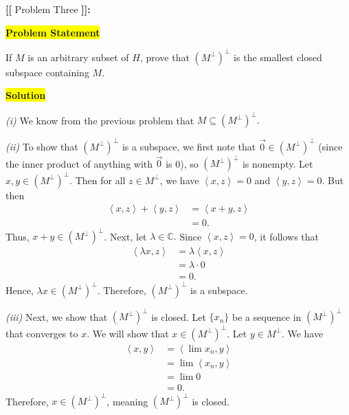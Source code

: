 \documentclass[12pt]{article}
\newcommand{\mybox}{%
    \collectbox{%
        \setlength{\fboxsep}{2pt}%
        \fbox{\BOXCONTENT}%
    }%
}
\begin{document}
\pagebreak

\noindent \textbf{{\huge [}{\Large [}} Problem Three \textbf{{\Large ]}{\huge ]}}{\Large \textbf{:}}

\vspace{3mm}

\noindent\mybox{\colorbox{yellow}{\textbf{Problem Statement}}}\hspace{3mm}\hrulefill 

\noindent If $M$ is an arbitrary subset of $H$, prove that $\left(M^{\perp}\right)^{\perp}$ is the smallest closed subspace containing $M$.

\vspace{5mm}

\noindent\mybox{\colorbox{yellow}{\textbf{Solution}}}\hspace{3mm}\hrulefill

\noindent \textit{(i)} We know from the previous problem that $M\subseteq \left(M^{\perp}\right)^{\perp}.$ 

\textit{(ii)} To show that $\left(M^{\perp}\right)^{\perp}$ is a subspace, we first note that $\vec{0}\in\left(M^{\perp}\right)^{\perp}$ (since the inner product of anything with $\vec{0}$ is 0), so $\left(M^{\perp}\right)^{\perp}$ is nonempty. Let $x,y\in\left(M^{\perp}\right)^{\perp}$. Then for all $z\in M^{\perp}$, we have $\left<x,z\right> = 0$ and $\left<y,z\right> = 0.$ But then 
\begin{align}
    \left<x,z\right> + \left<y,z\right> &= \left<x+y, z\right> \\
    &=0.
\end{align}
Thus, $x+y\in \left(M^{\perp}\right)^{\perp}$. Next, let $\lambda\in\mathbb{C}.$ Since $\left<x,z\right> = 0$, it follows that
\begin{align}
    \left<\lambda x, z\right> &= \lambda\left<x, z\right> \\
    &= \lambda \cdot0 \\
    &= 0.
\end{align}
Hence, $\lambda x \in \left(M^{\perp}\right)^{\perp}$. Therefore, $\left(M^{\perp}\right)^{\perp}$ is a subspace. 

\textit{(iii)} Next, we show that $\left(M^{\perp}\right)^{\perp}$ is closed. Let $\lbrace x_n \rbrace$ be a sequence in $\left(M^{\perp}\right)^{\perp}$ that converges to $x$. We will show that $x\in\left(M^{\perp}\right)^{\perp}$. Let $y\in M^{\perp}.$ We have
\begin{align}
    \left<x,y\right> &= \left<\lim x_n, y\right> \\
    &= \lim\left<x_n, y\right> \\
    &= \lim 0 \\
    &= 0.
\end{align}
Therefore, $x\in\left(M^{\perp}\right)^{\perp}$, meaning  $\left(M^{\perp}\right)^{\perp}$ is closed. 
\end{document}
